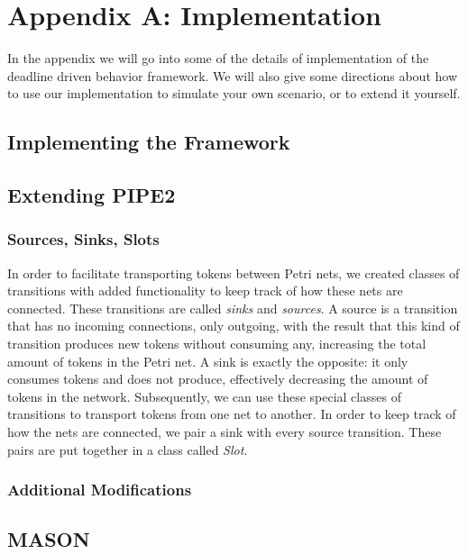\documentclass[11pt]{book}
\begin{document}
\appendix

\section{Appendix A: Implementation}
In the appendix we will go into some of the details of implementation of the deadline driven behavior framework. We will also give some directions about how to use our implementation to simulate your own scenario, or to extend it yourself.


\subsection{Implementing the Framework}


\subsection{Extending PIPE2}

\subsubsection{Sources, Sinks, Slots}
In order to facilitate transporting tokens between Petri nets, we created classes of transitions with added functionality to keep track of how these nets are connected. These transitions are called \emph{sinks} and \emph{sources}. A source is a transition that has no incoming connections, only outgoing, with the result that this kind of transition produces new tokens without consuming any, increasing the total amount of tokens in the Petri net. A sink is exactly the opposite: it only consumes tokens and does not produce, effectively decreasing the amount of tokens in the network. Subsequently, we can use these special classes of transitions to transport tokens from one net to another. In order to keep track of how the nets are connected, we pair a sink with every source transition. These pairs are put together in a class called \emph{Slot}.

\subsubsection{Additional Modifications}


\subsection{MASON}
\end{document}
